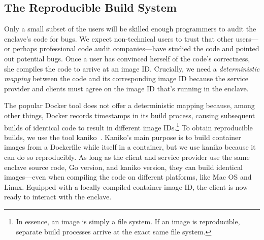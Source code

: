 

\subsection{The Reproducible Build System}
\label{sec:build-system}

Only a small subset of the users will be skilled enough programmers to audit
the enclave's code for bugs.  We expect non-technical users to trust that other
users---or perhaps professional code audit companies---have studied the code
and pointed out potential bugs.  Once a user has convinced herself of the code's
correctness, she compiles the code to arrive at an image ID.  Crucially, we
need a \emph{deterministic mapping} between the code and its corresponding
image ID because the service provider and clients must agree on the image ID
that's running in the enclave.

The popular Docker tool does not offer a deterministic mapping because, among other things,
Docker records timestamps in its build process, causing subsequent builds of
identical code to result in different image IDs.\footnote{In essence, an image
is simply a file system.  If an image is reproducible, separate build processes
arrive at the exact same file system.}  To obtain reproducible builds, we use
the tool kaniko~\cite{kaniko}.  Kaniko's main purpose is to build container
images from a Dockerfile while itself in a container, but we use kaniko because
it can do so reproducibly.  As long as the client and service provider use the
same enclave source code, Go version, and kaniko version, they can build
identical images---even when compiling the code on different platforms, like
Mac OS and Linux.  Equipped with a locally-compiled container image ID, the
client is now ready to interact with the enclave.

